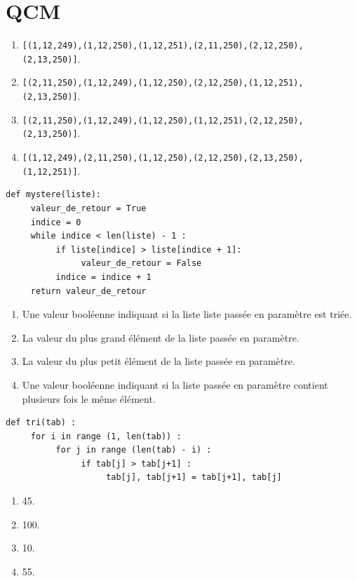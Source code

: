 \section{QCM}
\begin{enumerate}
\item \texttt{[(1,12,249),(1,12,250),(1,12,251),(2,11,250),(2,12,250),(2,13,250)]}.
\item \texttt{[(2,11,250),(1,12,249),(1,12,250),(2,12,250),(1,12,251),(2,13,250)]}.%
\item \texttt{[(2,11,250),(1,12,249),(1,12,250),(1,12,251),(2,12,250),(2,13,250)]}.
\item \texttt{[(1,12,249),(2,11,250),(1,12,250),(2,12,250),(2,13,250),(1,12,251)]}.
\end{enumerate}

\begin{lstlisting}
def mystere(liste):
     valeur_de_retour = True
     indice = 0
     while indice < len(liste) - 1 :
          if liste[indice] > liste[indice + 1]:
               valeur_de_retour = False
          indice = indice + 1
     return valeur_de_retour
\end{lstlisting}
\begin{enumerate}
\item Une valeur booléenne indiquant si la liste liste passée en paramètre est triée. %
\item La valeur du plus grand élément de la liste passée en paramètre.
\item La valeur du plus petit élément de la liste passée en paramètre.
\item Une valeur booléenne indiquant si la liste passée en paramètre contient plusieurs fois le même élément.
\end{enumerate}

\begin{lstlisting}
def tri(tab) :
     for i in range (1, len(tab)) :
          for j in range (len(tab) - i) :
               if tab[j] > tab[j+1] :
                    tab[j], tab[j+1] = tab[j+1], tab[j]
\end{lstlisting}
\begin{enumerate}
\item 45. %
\item 100.
\item 10.
\item 55.
\end{enumerate}


